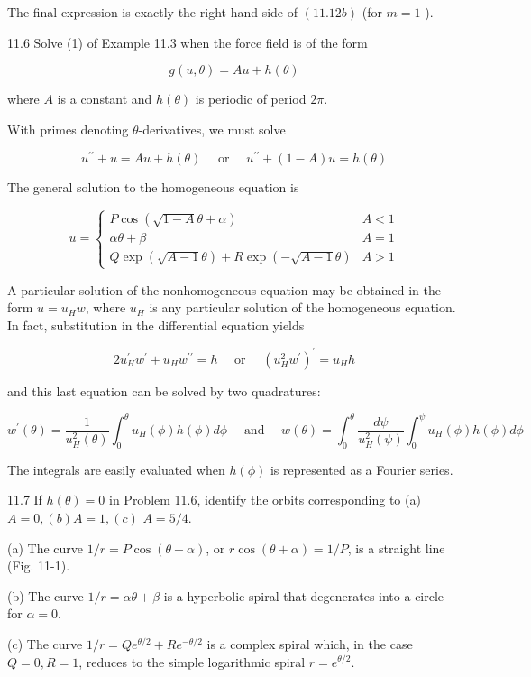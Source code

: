 \documentclass[10pt]{article}
\begin{document}
The final expression is exactly the right-hand side of $(11.12 b)$ (for $m=1$ ).

11.6 Solve (1) of Example 11.3 when the force field is of the form

$$
g(u, \theta)=A u+h(\theta)
$$

where $A$ is a constant and $h(\theta)$ is periodic of period $2 \pi$.

With primes denoting $\theta$-derivatives, we must solve

$$
u^{\prime \prime}+u=A u+h(\theta) \quad \text { or } \quad u^{\prime \prime}+(1-A) u=h(\theta)
$$

The general solution to the homogeneous equation is

$$
u= \begin{cases}P \cos (\sqrt{1-A} \theta+\alpha) & A<1 \\ \alpha \theta+\beta & A=1 \\ Q \exp (\sqrt{A-1} \theta)+R \exp (-\sqrt{A-1} \theta) & A>1\end{cases}
$$

A particular solution of the nonhomogeneous equation may be obtained in the form $u=u_{H} w$, where $u_{H}$ is any particular solution of the homogeneous equation. In fact, substitution in the differential equation yields

$$
2 u_{H}^{\prime} w^{\prime}+u_{H} w^{\prime \prime}=h \quad \text { or } \quad\left(u_{H}^{2} w^{\prime}\right)^{\prime}=u_{H} h
$$

and this last equation can be solved by two quadratures:

$$
w^{\prime}(\theta)=\frac{1}{u_{H}^{2}(\theta)} \int_{0}^{\theta} u_{H}(\phi) h(\phi) d \phi \quad \text { and } \quad w(\theta)=\int_{0}^{\theta} \frac{d \psi}{u_{H}^{2}(\psi)} \int_{0}^{\psi} u_{H}(\phi) h(\phi) d \phi
$$

The integrals are easily evaluated when $h(\phi)$ is represented as a Fourier series.

11.7 If $h(\theta)=0$ in Problem 11.6, identify the orbits corresponding to (a) $A=0,(b) A=1,(c)$ $A=5 / 4$.

(a) The curve $1 / r=P \cos (\theta+\alpha)$, or $r \cos (\theta+\alpha)=1 / P$, is a straight line (Fig. 11-1).

(b) The curve $1 / r=\alpha \theta+\beta$ is a hyperbolic spiral that degenerates into a circle for $\alpha=0$.

(c) The curve $1 / r=Q e^{\theta / 2}+R e^{-\theta / 2}$ is a complex spiral which, in the case $Q=0, R=1$, reduces to the simple logarithmic spiral $r=e^{\theta / 2}$.
\end{document}
